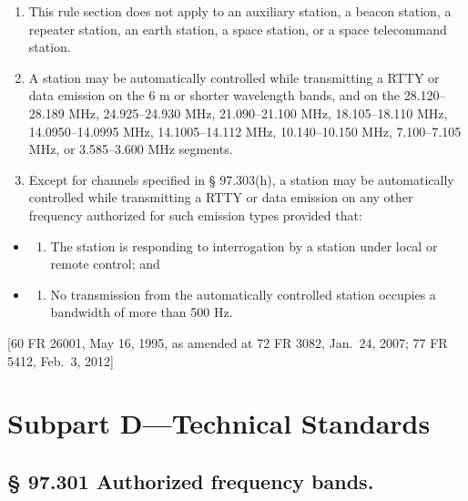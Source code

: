 \documentclass[
  letterpaper,
  DIV=11,
  numbers=noendperiod]{scrreport}
\providecommand{\tightlist}{%
  \setlength{\itemsep}{0pt}\setlength{\parskip}{0pt}}\usepackage{longtable,booktabs,array}
\begin{document}
\begin{enumerate}
\def\labelenumi{(\alph{enumi})}
\item
  This rule section does not apply to an auxiliary station, a beacon
  station, a repeater station, an earth station, a space station, or a
  space telecommand station.
\item
  A station may be automatically controlled while transmitting a RTTY or
  data emission on the 6 m or shorter wavelength bands, and on the
  28.120--28.189 MHz, 24.925--24.930 MHz, 21.090--21.100 MHz,
  18.105--18.110 MHz, 14.0950--14.0995 MHz, 14.1005--14.112 MHz,
  10.140--10.150 MHz, 7.100--7.105 MHz, or 3.585--3.600 MHz segments.
\item
  Except for channels specified in § 97.303(h), a station may be
  automatically controlled while transmitting a RTTY or data emission on
  any other frequency authorized for such emission types provided that:
\end{enumerate}

\begin{itemize}
\item
  \begin{enumerate}
  \def\labelenumi{(\arabic{enumi})}
  \tightlist
  \item
    The station is responding to interrogation by a station under local
    or remote control; and
  \end{enumerate}
\item
  \begin{enumerate}
  \def\labelenumi{(\arabic{enumi})}
  \setcounter{enumi}{1}
  \tightlist
  \item
    No transmission from the automatically controlled station occupies a
    bandwidth of more than 500 Hz.
  \end{enumerate}
\end{itemize}

{[}60 FR 26001, May 16, 1995, as amended at 72 FR 3082, Jan.~24, 2007;
77 FR 5412, Feb.~3, 2012{]}

\hypertarget{subpart-dtechnical-standards}{%
\section*{Subpart D---Technical
Standards}\label{subpart-dtechnical-standards}}


\hypertarget{97.301}{%
\subsection*{§ 97.301 Authorized frequency bands.}\label{97.301}}
\end{document}
